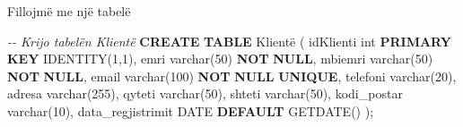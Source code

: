 \documentclass[
  ignorenonframetext,
]{beamer}
\newenvironment{Shaded}{\begin{snugshade}}{\end{snugshade}}
\newcommand{\CommentTok}[1]{\textcolor[rgb]{0.56,0.35,0.01}{\textit{#1}}}
\newcommand{\DataTypeTok}[1]{\textcolor[rgb]{0.13,0.29,0.53}{#1}}
\newcommand{\DecValTok}[1]{\textcolor[rgb]{0.00,0.00,0.81}{#1}}
\newcommand{\KeywordTok}[1]{\textcolor[rgb]{0.13,0.29,0.53}{\textbf{#1}}}
\newcommand{\NormalTok}[1]{#1}
\begin{document}
\begin{frame}[fragile]{Fillojmë me një tabelë}
\label{fillojmuxeb-me-njuxeb-tabeluxeb-6}

\begin{Shaded}
\begin{Highlighting}[]
\CommentTok{{-}{-} Krijo tabelën Klientë}
\KeywordTok{CREATE} \KeywordTok{TABLE}\NormalTok{ Klientë (}
\NormalTok{  idKlienti }\DataTypeTok{int} \KeywordTok{PRIMARY} \KeywordTok{KEY}\NormalTok{ IDENTITY(}\DecValTok{1}\NormalTok{,}\DecValTok{1}\NormalTok{),}
\NormalTok{  emri }\DataTypeTok{varchar}\NormalTok{(}\DecValTok{50}\NormalTok{) }\KeywordTok{NOT} \KeywordTok{NULL}\NormalTok{,}
\NormalTok{  mbiemri }\DataTypeTok{varchar}\NormalTok{(}\DecValTok{50}\NormalTok{) }\KeywordTok{NOT} \KeywordTok{NULL}\NormalTok{,}
\NormalTok{  email }\DataTypeTok{varchar}\NormalTok{(}\DecValTok{100}\NormalTok{) }\KeywordTok{NOT} \KeywordTok{NULL} \KeywordTok{UNIQUE}\NormalTok{,}
\NormalTok{  telefoni }\DataTypeTok{varchar}\NormalTok{(}\DecValTok{20}\NormalTok{),}
\NormalTok{  adresa }\DataTypeTok{varchar}\NormalTok{(}\DecValTok{255}\NormalTok{),}
\NormalTok{  qyteti }\DataTypeTok{varchar}\NormalTok{(}\DecValTok{50}\NormalTok{),}
\NormalTok{  shteti }\DataTypeTok{varchar}\NormalTok{(}\DecValTok{50}\NormalTok{),}
\NormalTok{  kodi\_postar }\DataTypeTok{varchar}\NormalTok{(}\DecValTok{10}\NormalTok{),}
\NormalTok{  data\_regjistrimit }\DataTypeTok{DATE} \KeywordTok{DEFAULT}\NormalTok{ GETDATE()}
\NormalTok{);}
\end{Highlighting}
\end{Shaded}
\end{frame}
\end{document}

